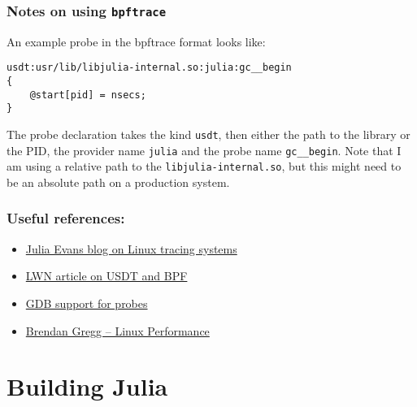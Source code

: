 \subsection{Notes on using \texttt{bpftrace}}



An example probe in the bpftrace format looks like:




\begin{lstlisting}
usdt:usr/lib/libjulia-internal.so:julia:gc__begin
{
	@start[pid] = nsecs;
}
\end{lstlisting}



The probe declaration takes the kind \texttt{usdt}, then either the path to the library or the PID, the provider name \texttt{julia} and the probe name \texttt{gc\_\_begin}. Note that I am using a relative path to the \texttt{libjulia-internal.so}, but this might need to be an absolute path on a production system.



\hypertarget{17401464672027654977}{}


\subsection{Useful references:}



\begin{itemize}
\item \href{https://jvns.ca/blog/2017/07/05/linux-tracing-systems}{Julia Evans blog on Linux tracing systems}


\item \href{https://lwn.net/Articles/753601/}{LWN article on USDT and BPF}


\item \href{https://sourceware.org/gdb/onlinedocs/gdb/Static-Probe-Points.html}{GDB support for probes}


\item \href{https://www.brendangregg.com/linuxperf.html}{Brendan Gregg – Linux Performance}

\end{itemize}


\chapter{Building Julia}


\hypertarget{16968142636188277999}{}


